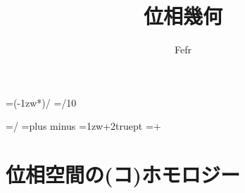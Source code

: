 \documentclass[dvipdfmx,a4paper,11pt]{jsarticle}
\begin{document}
\theoremstyle{plain}
\newtheorem{thm}{Theorem}[section]
\newtheorem{lem}[thm]{Lemma}
\newtheorem{prop}[thm]{Proposition}
\newtheorem{cor}[thm]{Corollary}
\newtheorem{conj}[thm]{Conjecture}

\theoremstyle{definition}
\newtheorem{ass}[thm]{Assumption}
\newtheorem{dfn}[thm]{Definition}

\theoremstyle{remark}
\newtheorem{rem}[thm]{Remark}

\theoremstyle{plain}
\newtheorem*{thm*}{Theorem}
\newtheorem*{lem*}{Lemma}
\newtheorem*{prop*}{Proposition}
\newtheorem*{cor*}{Corollary}
\newtheorem*{conj*}{Conjecture}

\theoremstyle{definition}
\newtheorem*{ass*}{Assumption}
\newtheorem*{dfn*}{Definition}

\theoremstyle{remark}
\newtheorem*{Proof}{Proof}


\theoremstyle{remark}
\newtheorem*{rem*}{Remark}

\setlength{\footskip}{20truemm}



\makeatletter
\newcount\@chars\newcount\@lines
{}                      %

\newdimen\@kanjiskip
\@kanjiskip=\dimexpr(\textwidth-1zw*\@chars)/\numexpr{}
\newdimen\@@kanjiskip
\@@kanjiskip=\dimexpr\@kanjiskip/10

\baselineskip=\dimexpr\textheight/\@lines
\kanjiskip=\@kanjiskip plus \@@kanjiskip minus \@@kanjiskip
\parindent=\dimexpr 1zw+2truept
\parindent=\dimexpr\parindent+\@kanjiskip
\makeatother


\title{位相幾何}
\date{}
\author{Fefr}
\maketitle
\tableofcontents
\clearpage


\section{位相空間の(コ)ホモロジー}
\end{document}
